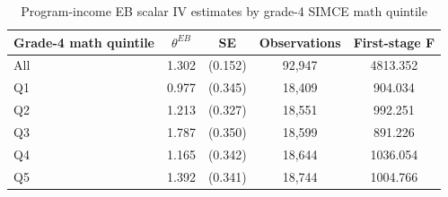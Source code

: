\begin{table}[!htbp]
\centering
\caption{Program-income EB scalar IV estimates by grade-4 SIMCE math quintile}
\label{tab:program_income_eb_iv_by_simce4_math_quintile}
\begin{tabular}{lcccc}
\toprule
Grade-4 math quintile & $\theta^{EB}$ & SE & Observations & First-stage F \\
\midrule
All & 1.302 & (0.152) & 92,947 & 4813.352 \\
Q1 & 0.977 & (0.345) & 18,409 & 904.034 \\
Q2 & 1.213 & (0.327) & 18,551 & 992.251 \\
Q3 & 1.787 & (0.350) & 18,599 & 891.226 \\
Q4 & 1.165 & (0.342) & 18,644 & 1036.054 \\
Q5 & 1.392 & (0.341) & 18,744 & 1004.766 \\
\bottomrule
\end{tabular}
\end{table}
